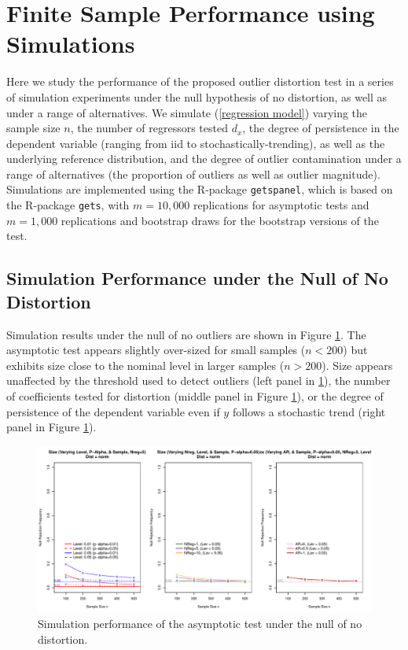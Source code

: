 \documentclass[11pt, letterpaper]{article}
\numberwithin{algorithm}{section}
\numberwithin{assumption}{section}
\numberwithin{lemma}{section}
\numberwithin{theorem}{section}
\numberwithin{corollary}{section}
\numberwithin{remark}{section}
\numberwithin{equation}{section}
\numberwithin{figure}{section}
\numberwithin{table}{section}
\begin{document}
\section{Finite Sample Performance using Simulations} \label{sec_simulations}
Here we study the performance of the proposed outlier distortion test in a series of simulation experiments under the null hypothesis of no distortion, as well as under a range of alternatives. We simulate (\ref{regression model}) varying the sample size $n$, the number of regressors tested $d_x$, the degree of persistence in the dependent variable (ranging from iid to stochastically-trending), as well as the underlying reference distribution, and the degree of outlier contamination under a range of alternatives (the proportion of outliers as well as outlier magnitude). Simulations are implemented using the R-package \texttt{getspanel}, which is based on the R-package \texttt{gets}, with $m=10,000$ replications for asymptotic tests and $m=1,000$ replications and bootstrap draws for the bootstrap versions of the test.

\subsection{Simulation Performance under the Null of No Distortion}


Simulation results under the null of no outliers are shown in Figure \ref{fig_out_sim_null}. The asymptotic test appears slightly over-sized for small samples ($n<200$) but exhibits size close to the nominal level in larger samples ($n>200$). Size appears unaffected by the threshold used to detect outliers (left panel in \ref{fig_out_sim_null}), the number of coefficients tested for distortion (middle panel in Figure \ref{fig_out_sim_null}), or the degree of persistence of the dependent variable even if $y$ follows a stochastic trend (right panel in Figure \ref{fig_out_sim_null}).

\begin{figure}[!htbp]  %
\centering
\includegraphics[scale=0.6]{null_distnorm.pdf}
\caption{Simulation performance of the asymptotic test under the null of no distortion.}
\label{fig_out_sim_null}
\end{figure}
\end{document}
